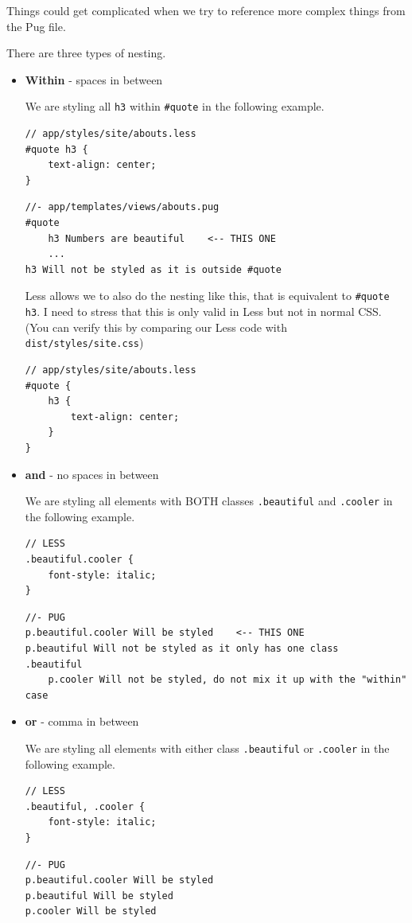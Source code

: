 Things could get complicated when we try to reference more complex things from the Pug file.

There are three types of nesting. 

\begin{itemize}
\item \textbf{Within} - spaces in between

We are styling all \texttt{h3} within \texttt{\#quote} in the following example.
    
\begin{lstlisting}[language=pug]
// app/styles/site/abouts.less
#quote h3 {
    text-align: center;
}
\end{lstlisting}
    
\begin{lstlisting}[language=pug]
//- app/templates/views/abouts.pug
#quote 
    h3 Numbers are beautiful    <-- THIS ONE
    ...
h3 Will not be styled as it is outside #quote
\end{lstlisting}

Less allows we to also do the nesting like this, that is equivalent to \texttt{\#quote h3}. I need to stress that this is only valid in Less but not in normal CSS. (You can verify this by comparing our Less code with \texttt{dist/styles/site.css})

\begin{lstlisting}[language=pug]
// app/styles/site/abouts.less
#quote {
    h3 {
        text-align: center;
    }
}
\end{lstlisting}

\item \textbf{and} - no spaces in between

We are styling all elements with BOTH classes \texttt{.beautiful} and \texttt{.cooler} in the following example.
    
\begin{lstlisting}[language=pug]
// LESS
.beautiful.cooler {
    font-style: italic;
}
\end{lstlisting}

\begin{lstlisting}[language=pug]
//- PUG
p.beautiful.cooler Will be styled    <-- THIS ONE
p.beautiful Will not be styled as it only has one class
.beautiful
    p.cooler Will not be styled, do not mix it up with the "within" case
\end{lstlisting}

\item \textbf{or} - comma in between

We are styling all elements with either class \texttt{.beautiful} or \texttt{.cooler} in the following example.
    
\begin{lstlisting}[language=pug]
// LESS
.beautiful, .cooler {
    font-style: italic;
}
\end{lstlisting}

\begin{lstlisting}[language=pug]
//- PUG
p.beautiful.cooler Will be styled 
p.beautiful Will be styled 
p.cooler Will be styled
\end{lstlisting}

\end{itemize}

